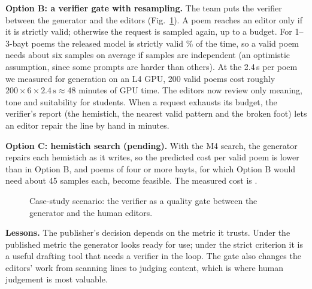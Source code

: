 \textbf{Option B: a verifier gate with resampling.} The team puts the verifier between the generator and the editors
(Fig.~\ref{fig:case}). A poem reaches an editor only if it is strictly valid; otherwise the request is sampled again,
up to a budget. For 1--3-bayt poems the released model is strictly valid \% of the time, so a valid poem
needs about six samples on average if samples are independent (an optimistic assumption, since some prompts are harder
than others). At the 2.4\,s per poem we measured for generation on an L4 GPU, 200 valid poems cost roughly
$200 \times 6 \times 2.4\,\mathrm{s} \approx 48$ minutes of GPU time. The editors now review only meaning, tone and
suitability for students. When a request exhausts its budget, the verifier's report (the hemistich, the nearest valid
pattern and the broken foot) lets an editor repair the line by hand in minutes.

\textbf{Option C: hemistich search (pending).} With the M4 search, the generator repairs each hemistich as it writes,
so the predicted cost per valid poem is lower than in Option B, and poems of four or more bayts, for which Option B
would need about 45 samples each, become feasible. The measured cost is .

\begin{figure}[t]
\centering
{}
\caption{Case-study scenario: the verifier as a quality gate between the generator and the human editors.}
\label{fig:case}
\end{figure}

\textbf{Lessons.} The publisher's decision depends on the metric it trusts. Under the published metric the generator
looks ready for use; under the strict criterion it is a useful drafting tool that needs a verifier in the loop. The
gate also changes the editors' work from scanning lines to judging content, which is where human judgement is most
valuable.
